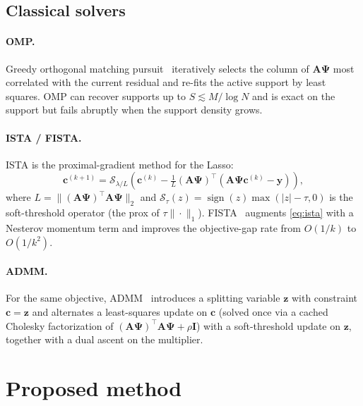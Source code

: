 \documentclass{article}
\begin{document}
\subsection{Classical solvers}

\paragraph{OMP.} Greedy orthogonal matching pursuit~\citep{tropp2007signal} iteratively selects the column of $\boldsymbol{A}\boldsymbol{\Psi}$ most correlated with the current residual and re-fits the active support by least squares. OMP can recover supports up to $S \lesssim M / \log N$ and is exact on the support but fails abruptly when the support density grows.

\paragraph{ISTA / FISTA.} ISTA is the proximal-gradient method for the Lasso:
\begin{equation}
  \boldsymbol{c}^{(k+1)} =
  \mathcal{S}_{\lambda/L}\!\left(
    \boldsymbol{c}^{(k)} - \tfrac{1}{L} (\boldsymbol{A}\boldsymbol{\Psi})^\top
    \!\left( \boldsymbol{A}\boldsymbol{\Psi}\boldsymbol{c}^{(k)} - \boldsymbol{y} \right)
  \right),
  \label{eq:ista}
\end{equation}
where $L = \|(\boldsymbol{A}\boldsymbol{\Psi})^\top \boldsymbol{A}\boldsymbol{\Psi}\|_2$ and $\mathcal{S}_\tau(z) = \operatorname{sign}(z)\max(|z|-\tau, 0)$ is the soft-threshold operator (the prox of $\tau\|\cdot\|_1$). FISTA~\citep{beck2009fast} augments \eqref{eq:ista} with a Nesterov momentum term and improves the objective-gap rate from $O(1/k)$ to $O(1/k^2)$.

\paragraph{ADMM.} For the same objective, ADMM~\citep{boyd2011distributed} introduces a splitting variable $\boldsymbol{z}$ with constraint $\boldsymbol{c} = \boldsymbol{z}$ and alternates a least-squares update on $\boldsymbol{c}$ (solved once via a cached Cholesky factorization of $(\boldsymbol{A}\boldsymbol{\Psi})^\top \boldsymbol{A}\boldsymbol{\Psi} + \rho \boldsymbol{I}$) with a soft-threshold update on $\boldsymbol{z}$, together with a dual ascent on the multiplier.

\section{Proposed method}
\label{sec:method}
\end{document}
